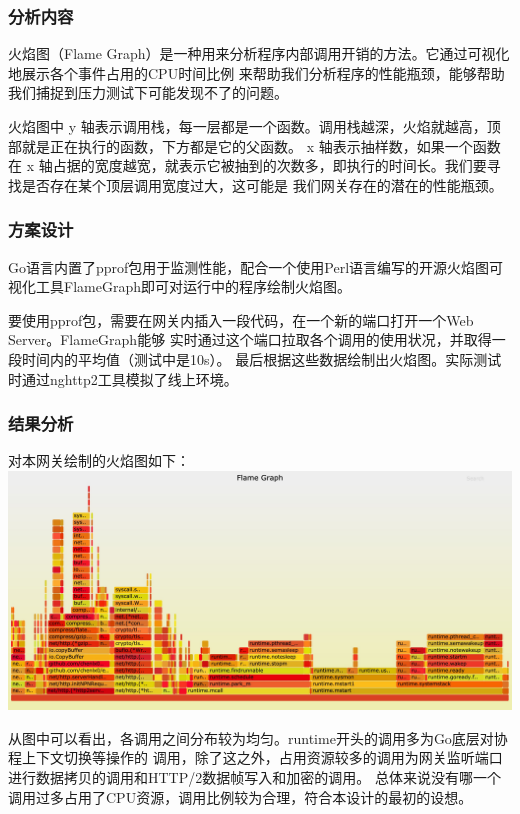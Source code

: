\documentclass[twoside]{CUGThesis}
\begin{document}
	\subsubsection{分析内容}
	火焰图（Flame Graph）是一种用来分析程序内部调用开销的方法\cite{gregg2017visualizing}。它通过可视化地展示各个事件占用的CPU时间比例
	来帮助我们分析程序的性能瓶颈，能够帮助我们捕捉到压力测试下可能发现不了的问题。\par
	火焰图中 y 轴表示调用栈，每一层都是一个函数。调用栈越深，火焰就越高，顶部就是正在执行的函数，下方都是它的父函数。
	x 轴表示抽样数，如果一个函数在 x 轴占据的宽度越宽，就表示它被抽到的次数多，即执行的时间长。我们要寻找是否存在某个顶层调用宽度过大，这可能是
	我们网关存在的潜在的性能瓶颈。\par
	\subsubsection{方案设计}
	Go语言内置了pprof包用于监测性能，配合一个使用Perl语言编写的开源火焰图可视化工具FlameGraph即可对运行中的程序绘制火焰图。\par 
	要使用pprof包，需要在网关内插入一段代码，在一个新的端口打开一个Web Server。FlameGraph能够
	实时通过这个端口拉取各个调用的使用状况，并取得一段时间内的平均值（测试中是10s）。
	最后根据这些数据绘制出火焰图。实际测试时通过nghttp2工具模拟了线上环境。
	\subsubsection{结果分析}
	对本网关绘制的火焰图如下：\\
	\includegraphics[scale=0.158]{Figures/flame_graph_simple.jpg}
	\par 
	从图中可以看出，各调用之间分布较为均匀。runtime开头的调用多为Go底层对协程上下文切换等操作的
	调用，除了这之外，占用资源较多的调用为网关监听端口进行数据拷贝的调用和HTTP/2数据帧写入和加密的调用。
	总体来说没有哪一个调用过多占用了CPU资源，调用比例较为合理，符合本设计的最初的设想。
\end{document}
